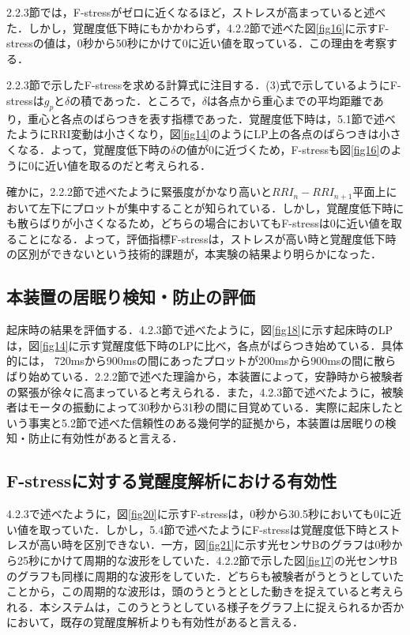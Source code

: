 2.2.3節では，F-stressがゼロに近くなるほど，ストレスが高まっている\cite{[9]}と述べた．しかし，覚醒度低下時にもかかわらず，4.2.2節で述べた図\ref{fig16}に示すF-stressの値は，0秒から50秒にかけて0に近い値を取っている．この理由を考察する．

2.2.3節で示したF-stressを求める計算式に注目する．(3)式で示しているようにF-stressは$g_p$と$\delta$の積であった．ところで，$\delta$は各点から重心までの平均距離であり，重心と各点のばらつきを表す指標であった．覚醒度低下時は，5.1節で述べたようにRRI変動は小さくなり，図\ref{fig14}のようにLP上の各点のばらつきは小さくなる．よって，覚醒度低下時の$\delta$の値が0に近づくため，F-stressも図\ref{fig16}のように0に近い値を取るのだと考えられる．

確かに，2.2.2節で述べたように緊張度がかなり高いと$RRI_n-RRI_{n+1}$平面上において左下にプロットが集中することが知られている\cite{[9]}．しかし，覚醒度低下時にも散らばりが小さくなるため，どちらの場合においてもF-stressは0に近い値を取ることになる．よって，評価指標F-stressは，ストレスが高い時と覚醒度低下時の区別ができないという技術的課題が，本実験の結果より明らかになった．


\subsection{本装置の居眠り検知・防止の評価}

起床時の結果を評価する．4.2.3節で述べたように，図\ref{fig18}に示す起床時のLPは，図\ref{fig14}に示す覚醒度低下時のLPに比べ，各点がばらつき始めている．具体的には， 720msから900msの間にあったプロットが200msから900msの間に散らばり始めている．2.2.2節で述べた理論から，本装置によって，安静時から被験者の緊張が徐々に高まっていると考えられる．また，4.2.3節で述べたように，被験者はモータの振動によって30秒から31秒の間に目覚めている．実際に起床したという事実と5.2節で述べた信頼性のある幾何学的証拠から，本装置は居眠りの検知・防止に有効性があると言える．

\subsection{F-stressに対する覚醒度解析における有効性}

4.2.3で述べたように，図\ref{fig20}に示すF-stressは，0秒から30.5秒においても0に近い値を取っていた．しかし，5.4節で述べたようにF-stressは覚醒度低下時とストレスが高い時を区別できない．一方，図\ref{fig21}に示す光センサBのグラフは0秒から25秒にかけて周期的な波形をしていた．4.2.2節で示した図\ref{fig17}の光センサBのグラフも同様に周期的な波形をしていた．どちらも被験者がうとうとしていたことから，この周期的な波形は，頭のうとうととした動きを捉えていると考えられる．本システムは，このうとうとしている様子をグラフ上に捉えられるか否かにおいて，既存の覚醒度解析よりも有効性があると言える．

